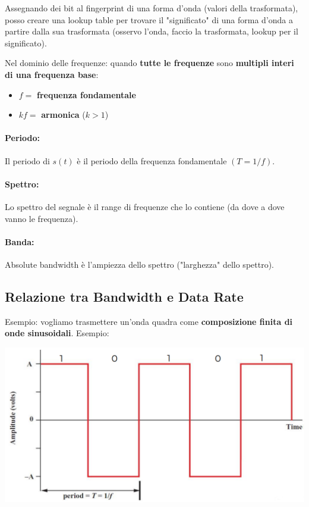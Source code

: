 Assegnando dei bit al fingerprint di una forma d'onda (valori della trasformata), posso creare una lookup table per trovare il "significato" di una forma d'onda a partire dalla sua trasformata (osservo l'onda, faccio la trasformata, lookup per il significato).\\

\newpage

Nel dominio delle frequenze: quando \textbf{tutte le frequenze} sono \textbf{multipli interi di una frequenza base}:
\begin{itemize}
	\item $f=$ \textbf{frequenza fondamentale}
	\item $kf =$ \textbf{armonica} ($k>1$)
\end{itemize} 

\paragraph{Periodo:} Il periodo di $s(t)$ è il periodo della frequenza fondamentale $(T = 1/f)$.

\paragraph{Spettro:} Lo spettro del segnale è il range di frequenze che lo contiene (da dove a dove vanno le frequenza).

\paragraph{Banda:} Absolute bandwidth è l'ampiezza dello spettro ("larghezza" dello spettro). \\

\newpage

\subsection{Relazione tra Bandwidth e Data Rate}

Esempio: vogliamo trasmettere un'onda quadra come \textbf{composizione finita di onde sinusoidali}. Esempio:
\begin{center}
	\includegraphics[width=0.7\linewidth]{img/PTT/quadra1}
\end{center}

